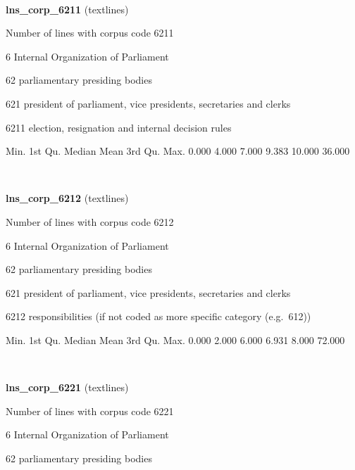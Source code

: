 \documentclass[]{article}
\newenvironment{Shaded}{\begin{snugshade}}{\end{snugshade}}
\newcommand{\FloatTok}[1]{\textcolor[rgb]{0.00,0.00,0.81}{{#1}}}
\newcommand{\NormalTok}[1]{{#1}}
\begin{document}
~

\vspace{1em}

\textbf{lns\_corp\_6211} (textlines)

Number of lines with corpus code 6211

6 Internal Organization of Parliament

62 parliamentary presiding bodies

621 president of parliament, vice presidents, secretaries and clerks

6211 election, resignation and internal decision rules

\begin{Shaded}
\begin{Highlighting}[]
   \NormalTok{Min. 1st Qu.  Median    Mean 3rd Qu.    Max. }
  \FloatTok{0.000}   \FloatTok{4.000}   \FloatTok{7.000}   \FloatTok{9.383}  \FloatTok{10.000}  \FloatTok{36.000} 
\end{Highlighting}
\end{Shaded}

~

\vspace{1em}

\textbf{lns\_corp\_6212} (textlines)

Number of lines with corpus code 6212

6 Internal Organization of Parliament

62 parliamentary presiding bodies

621 president of parliament, vice presidents, secretaries and clerks

6212 responsibilities (if not coded as more specific category
(e.g.~612))

\begin{Shaded}
\begin{Highlighting}[]
   \NormalTok{Min. 1st Qu.  Median    Mean 3rd Qu.    Max. }
  \FloatTok{0.000}   \FloatTok{2.000}   \FloatTok{6.000}   \FloatTok{6.931}   \FloatTok{8.000}  \FloatTok{72.000} 
\end{Highlighting}
\end{Shaded}

~

\vspace{1em}

\textbf{lns\_corp\_6221} (textlines)

Number of lines with corpus code 6221

6 Internal Organization of Parliament

62 parliamentary presiding bodies
\end{document}
